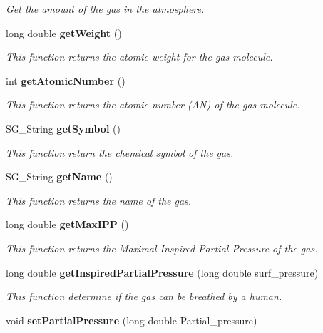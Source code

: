 \begin{CompactItemize}
\begin{CompactList}\small\item\em Get the amount of the gas in the atmosphere. \item\end{CompactList}\item 
long double {\bf get\-Weight} ()\label{class_s_g___gas_a13}

\begin{CompactList}\small\item\em This function returns the atomic weight for the gas molecule. \item\end{CompactList}\item 
int {\bf get\-Atomic\-Number} ()\label{class_s_g___gas_a14}

\begin{CompactList}\small\item\em This function returns the atomic number (AN) of the gas molecule. \item\end{CompactList}\item 
SG\_\-String {\bf get\-Symbol} ()\label{class_s_g___gas_a15}

\begin{CompactList}\small\item\em This function return the chemical symbol of the gas. \item\end{CompactList}\item 
SG\_\-String {\bf get\-Name} ()\label{class_s_g___gas_a16}

\begin{CompactList}\small\item\em This function returns the name of the gas. \item\end{CompactList}\item 
long double {\bf get\-Max\-IPP} ()
\begin{CompactList}\small\item\em This function returns the Maximal Inspired Partial Pressure of the gas. \item\end{CompactList}\item 
long double {\bf get\-Inspired\-Partial\-Pressure} (long double surf\_\-pressure)
\begin{CompactList}\small\item\em This function determine if the gas can be breathed by a human. \item\end{CompactList}\item 
void {\bf set\-Partial\-Pressure} (long double Partial\_\-pressure)\label{class_s_g___gas_a19}


\end{CompactItemize}
